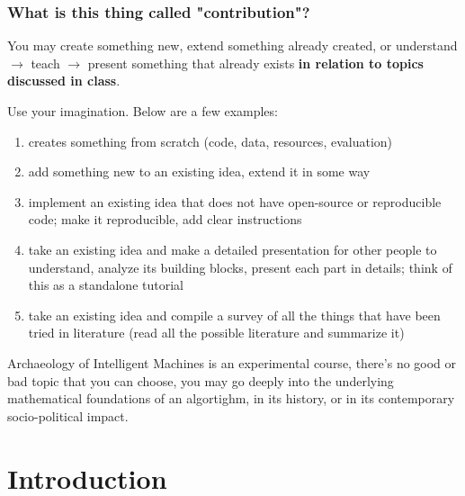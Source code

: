 \documentclass[11pt]{article}
\begin{document}
\subsubsection*{What is this thing called "contribution"?}
You may create something new, extend something already created, or understand $\rightarrow$ teach $\rightarrow$ present something that already exists \textbf{in relation to topics discussed in class}. 

Use your imagination. Below are a few examples:
\begin{enumerate}
	\item creates something from scratch (code, data, resources, evaluation)
	\item add something new to an existing idea, extend it in some way
	\item implement an existing idea that does not have open-source or reproducible code; make it reproducible, add clear instructions
	\item take an existing idea and make a detailed presentation for other people to understand, analyze its building blocks, present each part in details; think of this as a standalone tutorial
	\item take an existing idea and compile a survey of all the things that have been tried in literature (read all the possible literature and summarize it)
\end{enumerate}


Archaeology of Intelligent Machines is an experimental course, there's no good or bad topic that you can choose, you may go deeply into the underlying mathematical foundations of an algortighm, in its history, or in its contemporary socio-political impact.




\newpage

\section{Introduction}
\label{section:intro}
\end{document}
